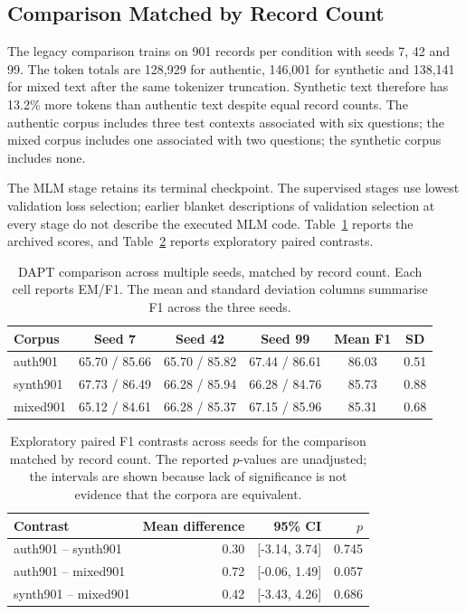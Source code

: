 \documentclass[pdflatex,sn-basic]{sn-jnl}
\begin{document}
\subsection{Comparison Matched by Record Count}\label{sec:size_matched}

The legacy comparison trains on 901 records per condition with seeds
7, 42 and 99. The token totals are 128,929 for authentic, 146,001 for
synthetic and 138,141 for mixed text after the same tokenizer truncation.
Synthetic text therefore has 13.2\% more tokens than authentic text despite
equal record counts. The authentic corpus includes three test contexts
associated with six questions; the mixed corpus includes one associated
with two questions; the synthetic corpus includes none.

The MLM stage retains its terminal checkpoint. The supervised stages use
lowest validation loss selection; earlier blanket descriptions of validation
selection at every stage do not describe the executed MLM code.
Table~\ref{tab:multiseed} reports the archived scores, and
Table~\ref{tab:paired_contrasts} reports exploratory paired contrasts.

\begin{table}[!htbp]
\caption{DAPT comparison across multiple seeds, matched by record count. Each cell reports EM/F1.
The mean and standard deviation columns summarise F1 across the three seeds.}
\label{tab:multiseed}
\centering
\begin{tabular}{@{}lccccc@{}}
\toprule
Corpus & Seed 7 & Seed 42 & Seed 99 & Mean F1 & SD \\
\midrule
auth901  & 65.70 / 85.66 & 65.70 / 85.82 & 67.44 / 86.61 & 86.03 & 0.51 \\
synth901 & 67.73 / 86.49 & 66.28 / 85.94 & 66.28 / 84.76 & 85.73 & 0.88 \\
mixed901 & 65.12 / 84.61 & 66.28 / 85.37 & 67.15 / 85.96 & 85.31 & 0.68 \\
\bottomrule
\end{tabular}
\end{table}

\begin{table}[!htbp]
\caption{Exploratory paired F1 contrasts across seeds for the comparison
matched by record count. The reported \(p\)-values are unadjusted; the intervals are shown
because lack of significance is not evidence that the corpora are equivalent.}
\label{tab:paired_contrasts}
\centering
\begin{tabular}{@{}lrrr@{}}
\toprule
Contrast & Mean difference & 95\% CI & \(p\) \\
\midrule
auth901 -- synth901 & 0.30 & [-3.14, 3.74] & 0.745 \\
auth901 -- mixed901 & 0.72 & [-0.06, 1.49] & 0.057 \\
synth901 -- mixed901 & 0.42 & [-3.43, 4.26] & 0.686 \\
\bottomrule
\end{tabular}
\end{table}
\end{document}

